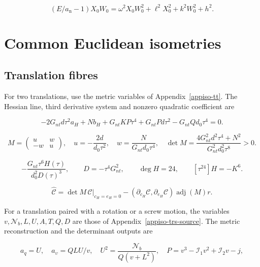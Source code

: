 \begin{equation}\label{supp:fnd:constantnormpoly}
(E/a_{\mathrm n}-1)X_0W_0=\omega^2X_0W_0^2+\ell^2X_0^2+k^2W_0^2+h^2.
\end{equation}

\clearpage
\section{Common Euclidean isometries}\label{supp:isometries}

\subsection{Translation fibres}

For two translations, use the metric variables of
Appendix~\ref{appiso-tt}. The Hessian line, third derivative
system and nonzero quadratic coefficient are

\begin{equation}\label{supp:iso:tt-line}
 -2G_{nt}d\tau^2a_H+N b_H+G_{nt}KP\tau^4+G_{nt}Pd\tau^2-G_{nt}Qd_0\tau^4=0.
\end{equation}

\begin{equation}\label{supp:iso:tt-third}
 M=\begin{pmatrix}u&w\\-w&u\end{pmatrix},\quad
 u=-\frac{2d}{d_0\tau^2},\quad w=\frac{N}{G_{nt}d_0\tau^4},\quad
 \det M=\frac{4G_{nt}^2d^2\tau^4+N^2}{G_{nt}^2d_0^2\tau^8}>0.
\end{equation}

\begin{equation}\label{supp:iso:tt-leading}
 -\frac{G_{nt}\tau^6 H(\tau)}{d_0^2D(\tau)^3},\qquad
 D=-\tau^4G_{nt}^2,\qquad \deg H=24,\qquad [\tau^{24}]H=-K^6.
\end{equation}

\begin{equation}\label{supp:appiso-tt-adjugate}
 \widehat{\mathcal C}
 =\det M\,\mathcal C|_{c_H=e_H=0}
   -(\partial_{c_H}\mathcal C,\partial_{e_H}\mathcal C)
                   \operatorname{adj}(M)r.
\end{equation}

For a translation paired with a rotation or a screw motion, the
variables $v,\mathcal N_b,L,U,A,T,Q,D$ are those of
Appendix~\ref{appiso-trs-source}. The metric reconstruction and
the determinant outputs are

\begin{equation}\label{supp:iso:trs-shape}
 a_q=U,\quad a_\upsilon=QLU/v,\quad
 U^2=\frac{\mathcal N_b}{Q(v+L^2)},\quad
 P=v^3-\mathcal I_1v^2+\mathcal I_2v-j,
\end{equation}

